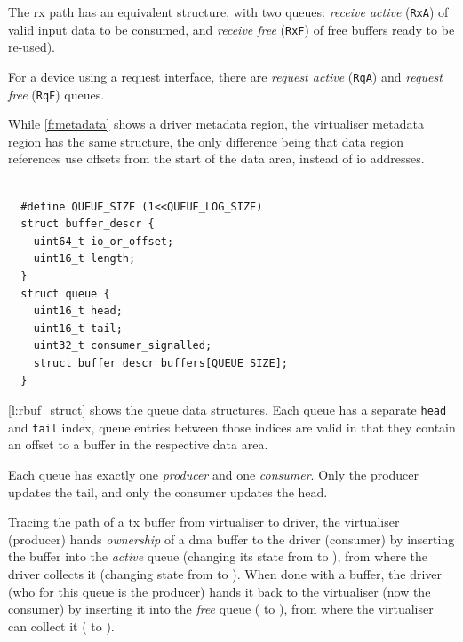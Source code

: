 \documentclass[a4paper,12pt]{report}
\newcommand*\circled[1]{\tikz[baseline=(char.base)]{
            \node[shape=circle,draw,inner sep=0pt,thick] (char) {#1};}}
\newcommand{\code}[1]{\texttt{#1}}
\begin{document}
The \gls{rx} path has an equivalent structure, with two queues:
\emph{receive active} (\code{RxA}) of valid input data
to be consumed, and \emph{receive free}
(\code{RxF}) of free buffers ready to be re-used).

For a device using a request interface, there are
\emph{request active} (\code{RqA}) and \emph{request free}
(\code{RqF}) queues.

While \autoref{f:metadata} shows a driver metadata region, the virtualiser
metadata region has the same structure, the only difference being that
data region references use offsets from the start of the data area,
instead of \gls{io} addresses.

\begin{lstlisting}[gobble=2,firstline=2,float=th,tabsize=2,
  label={l:rbuf_struct},
  caption={Control region queue data structures.}]

  #define QUEUE_SIZE (1<<QUEUE_LOG_SIZE)
  struct buffer_descr {
    uint64_t io_or_offset;
    uint16_t length;
  }
  struct queue {
    uint16_t head;
    uint16_t tail;
    uint32_t consumer_signalled;
    struct buffer_descr buffers[QUEUE_SIZE];
  }
\end{lstlisting}

\autoref{l:rbuf_struct} shows the queue data structures.
Each queue has a separate \code{head} and \code{tail} index,
queue entries between those indices are valid in that they
contain an offset to a buffer in the respective data area.

Each queue has exactly one \emph{producer} and one
\emph{consumer}. Only the producer updates the tail, and
only the consumer updates the head.

Tracing the path of a \gls{tx} buffer from virtualiser to driver, the virtualiser (producer) hands
\emph{ownership} of a \gls{dma} buffer to the driver (consumer) by inserting the buffer into the \emph{active}
queue (changing its state from \circled{\ref{st:so_u}} to \circled{\ref{st:do_i}}), from where
the driver collects it (changing state from \circled{\ref{st:do_i}} to \circled{\ref{st:do_u}}). When done with a buffer,
the driver (who for this queue is the producer) hands it back to the virtualiser (now the consumer) by inserting it into the
\emph{free} queue (\circled{\ref{st:do_u}} to \circled{\ref{st:so_i}}), from where the virtualiser
can collect it (\circled{\ref{st:so_i}} to \circled{\ref{st:so_u}}).
\end{document}
